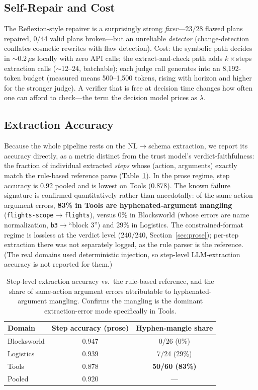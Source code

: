 \documentclass[letterpaper]{article}
\begin{document}
\subsection{Self-Repair and Cost}

The Reflexion-style repairer is a surprisingly strong \emph{fixer}---23/28
flawed plans repaired, 0/44 valid plans broken---but an unreliable
\emph{detector} (change-detection conflates cosmetic rewrites with flaw
detection). Cost: the symbolic path decides in ${\sim}0.2\,\mu$s locally
with zero API calls; the extract-and-check path adds $k{\times}$steps
extraction calls (${\sim}$12--24, batchable); each judge call generates
into an 8{,}192-token budget (measured means 500--1{,}500 tokens, rising
with horizon and higher for the stronger judge). A verifier that is free at
decision time changes how often one can afford to check---the term the
decision model prices as $\lambda$.

\subsection{Extraction Accuracy}
\label{sec:extraction}

Because the whole pipeline rests on the NL$\to$schema extraction, we report
its accuracy directly, as a metric distinct from the trust model's
verdict-faithfulness: the fraction of individual extracted \emph{steps} whose
(action, arguments) exactly match the rule-based reference parse
(Table~\ref{tab:extraction}). In the prose regime, step accuracy is
0.92 pooled and is lowest on Tools (0.878). The known failure signature is
confirmed quantitatively rather than anecdotally: of the same-action argument
errors, \textbf{83\% in Tools are hyphenated-argument mangling}
(\texttt{flights-scope}$\to$\texttt{flights}), versus 0\% in Blocksworld
(whose errors are name normalization, \texttt{b3}$\to$``block 3'') and 29\%
in Logistics. The constrained-format regime is lossless at the verdict level
(240/240, Section~\ref{sec:prose}); per-step extraction there was not
separately logged, as the rule parser is the reference. (The real domains
used deterministic injection, so step-level LLM-extraction accuracy is not
reported for them.)

\begin{table}[t]
\centering
\small
\begin{tabular}{lcc}
\toprule
Domain & Step accuracy (prose) & Hyphen-mangle share \\
\midrule
Blocksworld & 0.947 & 0/26 (0\%) \\
Logistics & 0.939 & 7/24 (29\%) \\
Tools & 0.878 & \textbf{50/60 (83\%)} \\
\midrule
Pooled & 0.920 & --- \\
\bottomrule
\end{tabular}
\caption{Step-level extraction accuracy vs.\ the rule-based reference, and
the share of same-action argument errors attributable to hyphenated-argument
mangling. Confirms the mangling is the dominant extraction-error mode
specifically in Tools.}
\label{tab:extraction}
\end{table}
\end{document}
